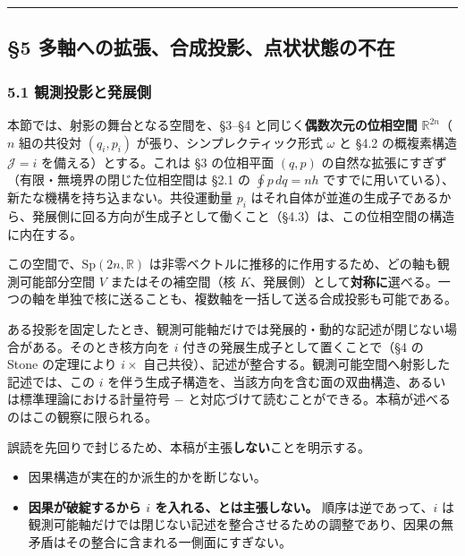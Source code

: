 \documentclass[
]{ltjsarticle}
\providecommand{\tightlist}{%
  \setlength{\itemsep}{0pt}\setlength{\parskip}{0pt}}
\begin{document}
\begin{center}\rule{0.5\linewidth}{0.5pt}\end{center}

\subsection{§5
多軸への拡張、合成投影、点状状態の不在}\label{ux591aux8ef8ux3078ux306eux62e1ux5f35ux5408ux6210ux6295ux5f71ux70b9ux72b6ux72b6ux614bux306eux4e0dux5728}

\subsubsection{5.1
観測投影と発展側}\label{ux89b3ux6e2cux6295ux5f71ux3068ux767aux5c55ux5074}

本節では、射影の舞台となる空間を、§3--§4
と同じく\textbf{偶数次元の位相空間} \(\mathbb{R}^{2n}\)（\(n\)
組の共役対 \((q_i,p_i)\) が張り、シンプレクティック形式 \(\omega\) と
§4.2 の概複素構造 \(\mathcal{J}=i\) を備える）とする。これは §3
の位相平面 \((q,p)\)
の自然な拡張にすぎず（有限・無境界の閉じた位相空間は §2.1 の
\(\oint p\,dq=nh\)
ですでに用いている）、新たな機構を持ち込まない。共役運動量 \(p_i\)
はそれ自体が並進の生成子であるから、発展側に回る方向が生成子として働くこと（§4.3）は、この位相空間の構造に内在する。

この空間で、\(\mathrm{Sp}(2n,\mathbb{R})\)
は非零ベクトルに推移的に作用するため、どの軸も観測可能部分空間 \(V\)
またはその補空間（核
\(K\)、発展側）として\textbf{対称に}選べる。一つの軸を単独で核に送ることも、複数軸を一括して送る合成投影も可能である。

ある投影を固定したとき、観測可能軸だけでは発展的・動的な記述が閉じない場合がある。そのとき核方向を
\(i\) 付きの発展生成子として置くことで（§4 の Stone の定理により
\(i\times\)
自己共役）、記述が整合する。観測可能空間へ射影した記述では、この \(i\)
を伴う生成子構造を、当該方向を含む面の双曲構造、あるいは標準理論における計量符号
\(-\) と対応づけて読むことができる。本稿が述べるのはこの観察に限られる。

誤読を先回りで封じるため、本稿が主張\textbf{しない}ことを明示する。

\begin{itemize}
\tightlist
\item
  因果構造が実在的か派生的かを断じない。
\item
  \textbf{因果が破綻するから \(i\) を入れる、とは主張しない。}
  順序は逆であって、\(i\)
  は観測可能軸だけでは閉じない記述を整合させるための調整であり、因果の無矛盾はその整合に含まれる一側面にすぎない。
\end{itemize}
\end{document}
